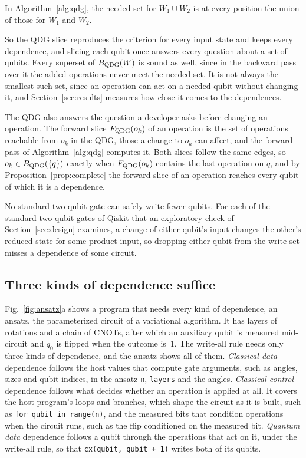 \begin{IEEEproof}
In Algorithm~\ref{alg:qdg}, the needed set for $W_1 \cup W_2$ is at every position the union
of those for $W_1$ and $W_2$.
\end{IEEEproof}

So the QDG slice reproduces the criterion for every input state and keeps every dependence, and slicing each qubit
once answers every question about a set of qubits. Every superset of $B_{\mathrm{QDG}}(W)$ is sound as well, since in the backward pass over it the added
operations never meet the needed set. It is not always the smallest such set, since an operation can act on a needed qubit without
changing it, and Section~\ref{sec:results} measures how close it comes to the dependences.

The QDG also answers the question a developer asks before changing an operation. The forward slice $F_{\mathrm{QDG}}(o_k)$ of an operation is the set of operations reachable from $o_k$ in the QDG, those a change to $o_k$ can affect, and the forward pass of Algorithm~\ref{alg:qdg} computes it. Both slices
follow the same edges, so $o_k \in B_{\mathrm{QDG}}(\{q\})$ exactly when $F_{\mathrm{QDG}}(o_k)$ contains the last operation on $q$, and by
Proposition~\ref{prop:complete} the forward slice of an operation reaches every qubit of which it is a dependence.

No standard two-qubit gate can safely write fewer qubits. For each of the \numGateSignalN{} standard two-qubit
gates of Qiskit that an exploratory check of Section~\ref{sec:design} examines, a change of either qubit's input
changes the other's reduced state for some product input, so dropping either qubit from the write set misses a
dependence of some circuit.

\subsection{Three kinds of dependence suffice}\label{sec:kinds}
Fig.~\ref{fig:ansatz}a shows a program that needs every kind of dependence, an ansatz, the parameterized circuit of
a variational algorithm. It has layers of rotations and a chain of CNOTs, after which an auxiliary qubit is measured
mid-circuit and $q_0$ is flipped when the outcome is~$1$. The write-all rule needs only three kinds of dependence, and
the ansatz shows all of them.
\emph{Classical data} dependence follows the host values that compute gate arguments, such as angles, sizes and qubit
indices, in the ansatz \texttt{n}, \texttt{layers} and the angles. \emph{Classical control} dependence follows what decides
whether an operation is applied at all. It covers the host program's loops and branches, which shape the circuit as
it is built, such as \texttt{for qubit in range(n)}, and the measured bits that condition operations when the circuit
runs, such as the flip conditioned on the measured bit. \emph{Quantum data} dependence follows a qubit through the
operations that act on it, under the write-all rule, so that \texttt{cx(qubit, qubit + 1)} writes both of its qubits.

